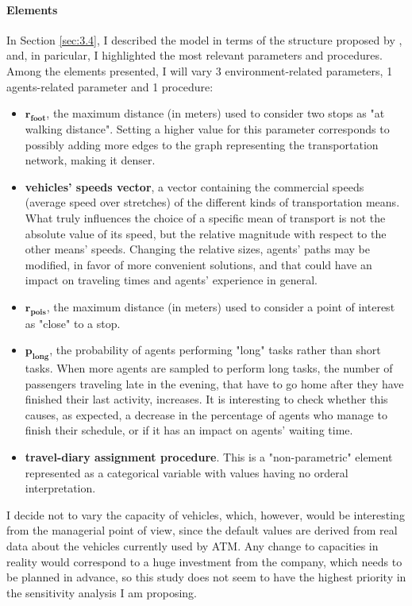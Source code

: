 \paragraph{Elements}
In Section \ref{sec:3.4}, I described the model in terms of the structure proposed by \textcite{Borgonovo2022SensitivityAO}, and, in paricular, I highlighted the most relevant parameters and procedures. Among the elements presented, I will vary 3 environment-related parameters, 1 agents-related parameter and 1 procedure:
\begin{itemize}
    \item $\mathbf{r_{foot}}$, the maximum distance (in meters) used to consider two stops as "at walking distance". Setting a higher value for this parameter corresponds to possibly adding more edges to the graph representing the transportation network, making it denser.
    \item \textbf{vehicles' speeds vector}, a vector containing the commercial speeds (average speed over stretches) of the different kinds of transportation means. What truly influences the choice of a specific mean of transport is not the absolute value of its speed, but the relative magnitude with respect to the other means' speeds. Changing the relative sizes, agents' paths may be modified, in favor of more convenient solutions, and that could have an impact on traveling times and agents' experience in general.
    \item $\mathbf{r_{pois}}$, the maximum distance (in meters) used to consider a point of interest as "close" to a stop. 
    \item $\mathbf{p_{long}}$, the probability of agents performing "long" tasks rather than short tasks. When more agents are sampled to perform long tasks, the number of passengers traveling late in the evening, that have to go home after they have finished their last activity, increases. It is interesting to check whether this causes, as expected, a decrease in the percentage of agents who manage to finish their schedule, or if it has an impact on agents' waiting time.
    \item \textbf{travel-diary assignment procedure}. This is a "non-parametric" element represented as a categorical variable with values having no orderal interpretation.
\end{itemize}
I decide not to vary the capacity of vehicles, which, however, would be interesting from the managerial point of view, since the default values are derived from real data about the vehicles currently used by ATM. Any change to capacities in reality would correspond to a huge investment from the company, which needs to be planned in advance, so this study does not seem to have the highest priority in the sensitivity analysis I am proposing.


